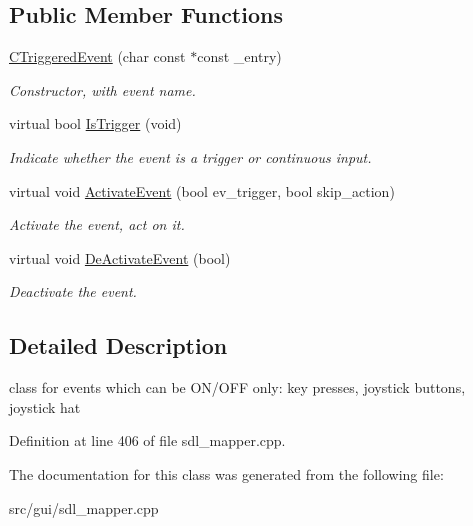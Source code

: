 \subsection*{Public Member Functions}
\begin{DoxyCompactItemize}
\item 
\hypertarget{classCTriggeredEvent_ac9f3fc82121e3632950dfd89e37fc90d}{\hyperlink{classCTriggeredEvent_ac9f3fc82121e3632950dfd89e37fc90d}{C\-Triggered\-Event} (char const $\ast$const \-\_\-entry)}\label{classCTriggeredEvent_ac9f3fc82121e3632950dfd89e37fc90d}

\begin{DoxyCompactList}\small\item\em Constructor, with event name. \end{DoxyCompactList}\item 
\hypertarget{classCTriggeredEvent_a4ab6cb9bc929db0b4281218ff1205cb6}{virtual bool \hyperlink{classCTriggeredEvent_a4ab6cb9bc929db0b4281218ff1205cb6}{Is\-Trigger} (void)}\label{classCTriggeredEvent_a4ab6cb9bc929db0b4281218ff1205cb6}

\begin{DoxyCompactList}\small\item\em Indicate whether the event is a trigger or continuous input. \end{DoxyCompactList}\item 
\hypertarget{classCTriggeredEvent_a29ccd4723c9cc4e779601a4330f346a3}{virtual void \hyperlink{classCTriggeredEvent_a29ccd4723c9cc4e779601a4330f346a3}{Activate\-Event} (bool ev\-\_\-trigger, bool skip\-\_\-action)}\label{classCTriggeredEvent_a29ccd4723c9cc4e779601a4330f346a3}

\begin{DoxyCompactList}\small\item\em Activate the event, act on it. \end{DoxyCompactList}\item 
\hypertarget{classCTriggeredEvent_a8ae31a06642b3e4c37e8760194fd7607}{virtual void \hyperlink{classCTriggeredEvent_a8ae31a06642b3e4c37e8760194fd7607}{De\-Activate\-Event} (bool)}\label{classCTriggeredEvent_a8ae31a06642b3e4c37e8760194fd7607}

\begin{DoxyCompactList}\small\item\em Deactivate the event. \end{DoxyCompactList}\end{DoxyCompactItemize}


\subsection{Detailed Description}
class for events which can be O\-N/\-O\-F\-F only\-: key presses, joystick buttons, joystick hat 

Definition at line 406 of file sdl\-\_\-mapper.\-cpp.



The documentation for this class was generated from the following file\-:\begin{DoxyCompactItemize}
\item 
src/gui/sdl\-\_\-mapper.\-cpp\end{DoxyCompactItemize}
